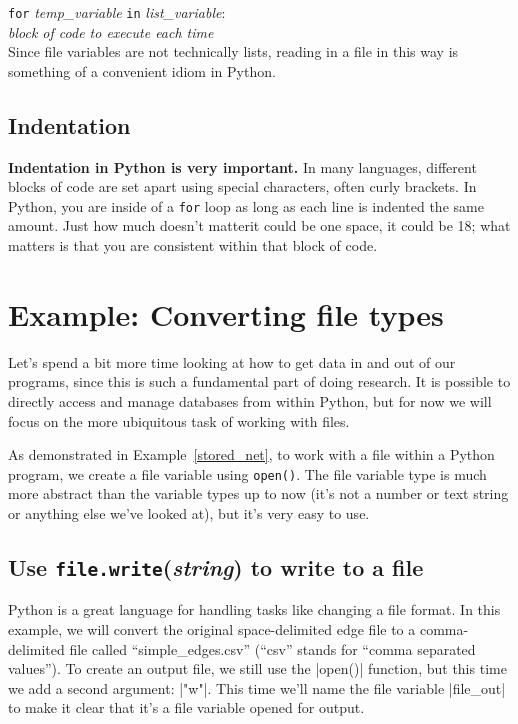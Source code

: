 \documentclass{article}
\begin{document}
\noindent \texttt{for} \textit{temp\_variable} \texttt{in} \textit{list\_variable}:\\
\indent \textit{block of code to execute each time}\\

Since file variables are not technically lists, reading in a file in this way is something of a convenient idiom in Python.

\subsection{Indentation}
\textbf{Indentation in Python is very important.}  In many languages, different
blocks of code are set apart using special characters, often curly brackets.  In
Python, you are inside of a \texttt{for} loop as long as each line is indented the
same amount.  Just how much doesn't matter\textemdash it could be one space, it
could be 18; what matters is that you are consistent within that block of code.

\section{Example: Converting file types}
Let's spend a bit more time looking at how to get data in and out of our programs, since this is such a fundamental part of doing research.
It is possible to directly access and manage databases from within Python, but for now we will focus on the more ubiquitous task of working with files.

As demonstrated in Example~\ref{stored_net}, to work with a file within a Python program, we create a file variable using \texttt{open()}.  The
file variable type is much more abstract than the variable types up to now (it's not a number or text string or anything else we've looked at),
 but it's very easy to use.

\subsection{Use \texttt{file.write}(\textit{string}) to write to a file}
Python is a great language for handling tasks like changing a file format.  In this example, we will convert the original space-delimited edge file
to a comma-delimited file called ``simple\_edges.csv'' (``csv'' stands for ``comma separated values'').  To create an output file, we still
use the |open()| function, but this time we add a second argument: |"w"|.  This
time we'll name the file variable |file_out| to make it clear that it's a file variable opened for output.
\end{document}
